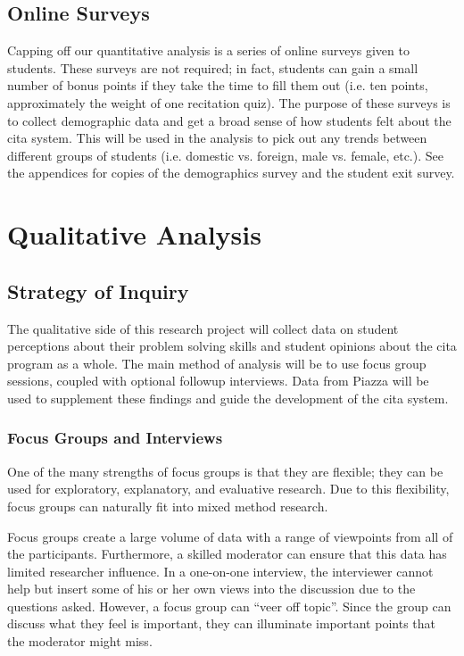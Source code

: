\subsection{Online Surveys}

Capping off our quantitative analysis is a series of online surveys given to students. These surveys are not required; in fact, students can gain a small number of bonus points if they take the time to fill them out (i.e. ten points, approximately the weight of one recitation quiz). The purpose of these surveys is to collect demographic data and get a broad sense of how students felt about the \gls{cita} system. This will be used in the analysis to pick out any trends between different groups of students (i.e. domestic vs. foreign, male vs. female, etc.). See the appendices for copies of the demographics survey and the student exit survey.

\section{Qualitative Analysis}

\subsection{Strategy of Inquiry}

The qualitative side of this research project will collect data on student perceptions about their problem solving skills and student opinions about the \gls{cita} program as a whole. The main method of analysis will be to use focus group sessions, coupled with optional followup interviews. Data from Piazza will be used to supplement these findings and guide the development of the \gls{cita} system.

\subsubsection{Focus Groups and Interviews}

One of the many strengths of focus groups is that they are flexible; they can be used for exploratory, explanatory, and evaluative research. Due to this flexibility, focus groups can naturally fit into mixed method research\cite{hennink2014}.

Focus groups create a large volume of data with a range of viewpoints from all of the participants. Furthermore, a skilled moderator can ensure that this data has limited researcher influence. In a one-on-one interview, the interviewer cannot help but insert some of his or her own views into the discussion due to the questions asked. However, a focus group can ``veer off topic''. Since the group can discuss what they feel is important, they can illuminate important points that the moderator might miss\cite{hennink2014}.

